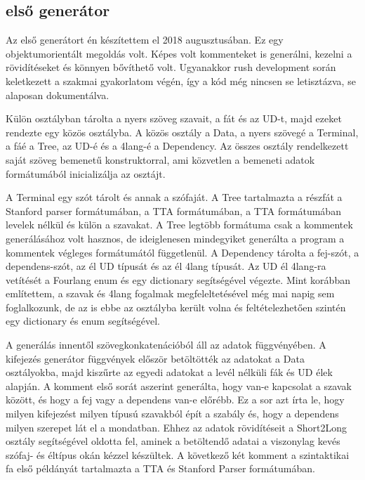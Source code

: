\subsection{első generátor}
\label{sec:generator1}
Az első generátort én készítettem el 2018 augusztusában. Ez egy objektumorientált megoldás volt. Képes volt kommenteket is generálni, kezelni a rövidítéseket és könnyen bővíthető volt. Ugyanakkor rush development során keletkezett a szakmai gyakorlatom végén, így a kód még nincsen se letisztázva, se alaposan dokumentálva.

Külön osztályban tárolta a nyers szöveg szavait, a fát és az UD-t, majd ezeket rendezte egy közös osztályba. A közös osztály a Data, a nyers szövegé a Terminal, a fáé a Tree, az UD-é és a 4lang-é a Dependency. Az összes osztály rendelkezett saját szöveg bemenetű konstruktorral, ami közvetlen a bemeneti adatok formátumából inicializálja az osztájt.

A Terminal egy szót tárolt és annak a szófaját. A Tree tartalmazta a részfát a Stanford parser formátumában, a TTA formátumában, a TTA formátumában levelek nélkül és külön a szavakat. A Tree legtöbb formátuma csak a kommentek generálásához volt hasznos, de ideiglenesen mindegyiket generálta a program a kommentek végleges formátumától függetlenül. A Dependency tárolta a fej-szót, a dependens-szót, az él UD típusát és az él 4lang típusát. Az UD él 4lang-ra vetítését a Fourlang enum és egy dictionary segítségével végezte. Mint korábban említettem, a szavak és 4lang fogalmak megfeleltetésével még mai napig sem foglalkozunk, de az is ebbe az osztályba került volna és feltételezhetően szintén egy dictionary és enum segítségével.

A generálás innentől szövegkonkatenációból áll az adatok függvényében.
A kifejezés generátor függvények először betöltötték az adatokat a Data osztályokba, majd kiszűrte az egyedi adatokat a levél nélküli fák és UD élek alapján. A komment első sorát aszerint generálta, hogy van-e kapcsolat a szavak között, és hogy a fej vagy a dependens van-e  előrébb. Ez a sor azt írta le, hogy milyen kifejezést milyen típusú szavakból épít a szabály és, hogy a dependens milyen szerepet lát el a mondatban. Ehhez az adatok rövidítéseit a Short2Long osztály segítségével oldotta fel, aminek a betöltendő adatai  a viszonylag kevés szófaj- és éltípus okán kézzel készültek. A következő két komment a szintaktikai fa első példányát tartalmazta a TTA és Stanford Parser formátumában. 

